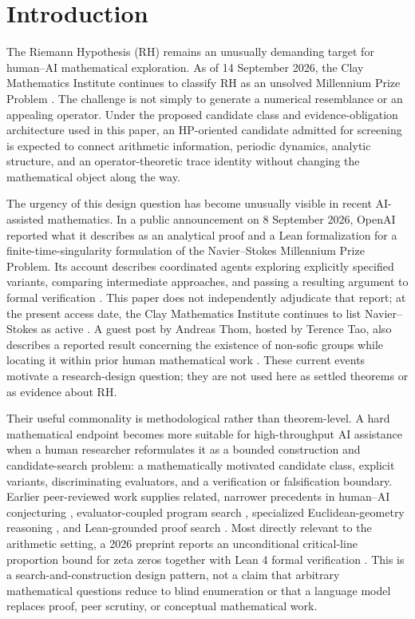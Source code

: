 \section{Introduction}

The Riemann Hypothesis (RH) remains an unusually demanding target for
human--AI mathematical exploration. As of 14 September 2026, the Clay
Mathematics Institute continues to classify RH as an unsolved Millennium Prize
Problem \citep{CMI2026}. The challenge is not simply to generate a numerical
resemblance or an appealing operator. Under the proposed candidate class and
evidence-obligation architecture used in this paper, an HP-oriented candidate
admitted for screening is expected to connect arithmetic information, periodic
dynamics, analytic structure, and an operator-theoretic trace identity without
changing the mathematical object along the way.

The urgency of this design question has become unusually visible in recent
AI-assisted mathematics. In a public announcement on 8 September 2026, OpenAI
reported what it describes as an analytical proof and a Lean formalization for
a finite-time-singularity formulation of the Navier--Stokes Millennium Prize
Problem. Its account describes coordinated agents exploring explicitly
specified variants, comparing intermediate approaches, and passing a resulting
argument to formal verification \citep{OpenAI2026NavierStokes}. This paper does
not independently adjudicate that report; at the present access date, the Clay
Mathematics Institute continues to list Navier--Stokes as active
\citep{CMI2026}. A guest post by Andreas Thom, hosted by Terence Tao, also
describes a reported result concerning the existence of non-sofic groups while
locating it within prior human mathematical work \citep{Thom2026NonSofic}.
These current events motivate a research-design question; they are not used
here as settled theorems or as evidence about RH.

Their useful commonality is methodological rather than theorem-level. A hard
mathematical endpoint becomes more suitable for high-throughput AI assistance
when a human researcher reformulates it as a bounded construction and
candidate-search problem: a mathematically motivated candidate class, explicit
variants, discriminating evaluators, and a verification or falsification
boundary. Earlier peer-reviewed work supplies related, narrower precedents in
human--AI conjecturing \citep{Davies2021}, evaluator-coupled program search
\citep{RomeraParedes2024}, specialized Euclidean-geometry reasoning
\citep{Trinh2024}, and Lean-grounded proof search \citep{Hubert2026}. Most
directly relevant to the arithmetic setting, a 2026 preprint reports an
unconditional critical-line proportion bound for zeta zeros together with Lean
4 formal verification \citep{AlpogeFurman2026}. This is a
search-and-construction design pattern, not a claim that arbitrary mathematical
questions reduce to blind enumeration or that a language model replaces proof,
peer scrutiny, or conceptual mathematical work.

